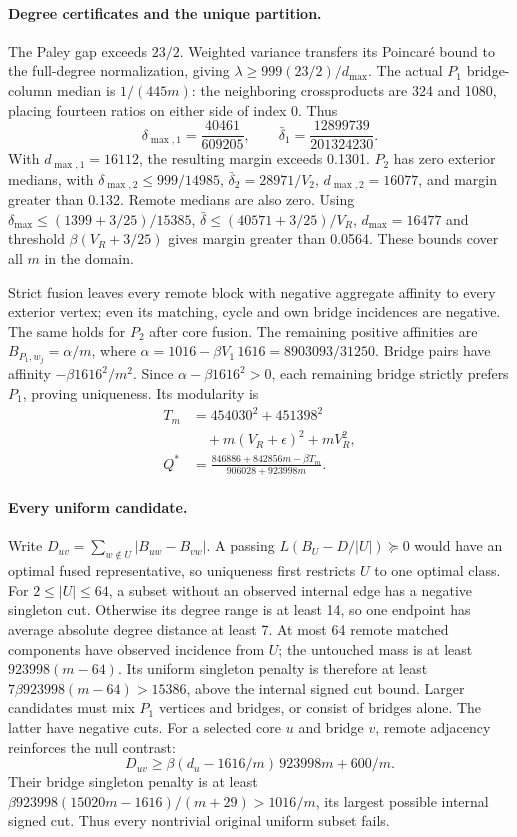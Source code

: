 \documentclass[sigconf,anonymous,review]{acmart}
\newcommand{\1}{\mathbf{1}}
\begin{document}
\paragraph{Degree certificates and the unique partition.}
The Paley gap exceeds $23/2$. Weighted variance transfers its Poincar\'e
bound to the full-degree normalization, giving
$\lambda\ge999(23/2)/d_{\max}$. The actual $P_1$ bridge-column median is
$1/(445m)$: the neighboring crossproducts are 324 and 1080, placing
fourteen ratios on either side of index 0. Thus
\[
 \delta_{\max,1}=\frac{40461}{609205},\qquad
 \bar\delta_1=\frac{12899739}{201324230}.
\]
With $d_{\max,1}=16112$, the resulting margin exceeds 0.1301.
$P_2$ has zero exterior medians, with
$\delta_{\max,2}\le999/14985$, $\bar\delta_2=28971/V_2$,
$d_{\max,2}=16077$, and margin greater than 0.132.
Remote medians are also zero. Using
$\delta_{\max}\le(1399+3/25)/15385$,
$\bar\delta\le(40571+3/25)/V_R$,
$d_{\max}=16477$ and threshold $\beta(V_R+3/25)$ gives
margin greater than 0.0564. These bounds cover all $m$ in the domain.

Strict fusion leaves every remote block with negative aggregate affinity
to every exterior vertex; even its matching, cycle and own bridge
incidences are negative. The same holds for $P_2$ after core fusion.
The remaining positive affinities are
$B_{P_1,w_j}=\alpha/m$, where
$\alpha=1016-\beta V_1\,1616=8903093/31250$.
Bridge pairs have affinity $-\beta1616^2/m^2$.
Since $\alpha-\beta1616^2>0$, each remaining bridge strictly prefers
$P_1$, proving uniqueness. Its modularity is
\[
 \begin{aligned}
 T_m&=454030^2+451398^2\\
    &\quad +m(V_R+\epsilon)^2+mV_R^2,\\
 Q^*&=\frac{846886+842856m-\beta T_m}{906028+923998m}.
 \end{aligned}
\]

\paragraph{Every uniform candidate.}
Write $D_{uv}=\sum_{w\notin U}|B_{uw}-B_{vw}|$.
A passing $L(B_U-D/|U|)\succeq0$ would have an optimal fused
representative, so uniqueness first restricts $U$ to one optimal class.
For $2\le|U|\le64$, a subset without an observed internal edge has a
negative singleton cut. Otherwise its degree range is at least 14,
so one endpoint has average absolute degree distance at least 7.
At most 64 remote matched components have observed incidence from $U$;
the untouched mass is at least $923998(m-64)$. Its uniform singleton
penalty is therefore at least $7\beta923998(m-64)>15386$, above the
internal signed cut bound.
Larger candidates must mix $P_1$ vertices and bridges, or consist of
bridges alone. The latter have negative cuts. For a selected core $u$
and bridge $v$, remote adjacency reinforces the null contrast:
\[
 D_{uv}\ge\beta(d_u-1616/m)\,923998m+600/m.
\]
Their bridge singleton penalty is at least
$\beta923998(15020m-1616)/(m+29)>1016/m$, its largest possible
internal signed cut. Thus every nontrivial original uniform subset fails.
\end{document}
